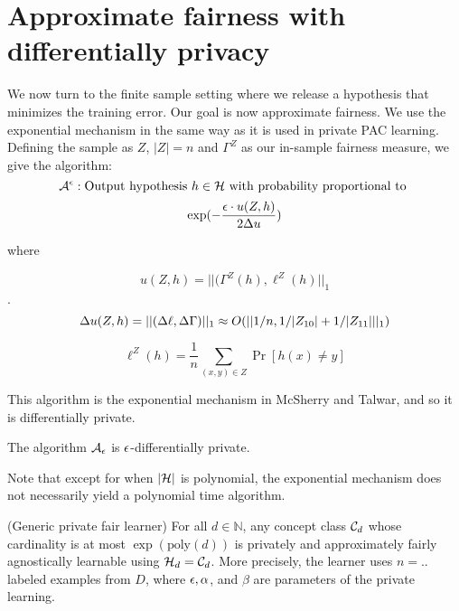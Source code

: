 
\section{Approximate fairness with differentially privacy}



We now turn to the finite sample setting where we release a hypothesis
that minimizes the training error. Our goal is now approximate
fairness. We use the exponential mechanism in the same way as it is
used in private PAC learning. Defining the sample as $Z$, $|Z| = n$ and
$\Gamma^{Z}$ as our in-sample fairness measure, we give the algorithm:
$$\mathcal{A}^\epsilon : \text{Output hypothesis }h \in \mathcal{H} \text{
with probability proportional to }$$
\begin{align}
\exp(-\frac{\epsilon \cdot u(Z,h)}{2\Delta u})
\end{align}

where

$$u(Z,h) = ||(\Gamma^Z(h), \ell^Z(h)||_{1}$$.
$$\Delta u(Z,h) = ||(\Delta\ell,\Delta{\Gamma})||_1 \approx O(||1/n,1/|Z_{10}|+1/|Z_{11}|||_1)$$

$$\ell^Z(h) = \frac{1}{n} \sum_{(x,y) \in Z}\Pr[h(x) \neq y]$$



This algorithm is the exponential mechanism in McSherry and Talwar, and so it is differentially private.

\begin{lemma}
  The algorithm $\mathcal{A}_\epsilon$ is $\epsilon$-differentially private.
\end{lemma}

Note that except for when $|\mathcal{H}|$ is polynomial, the exponential
mechanism does not necessarily yield a polynomial time algorithm.


\begin{theorem}
	(Generic private fair learner) For all $d \in \mathbb{N}$, any
  concept class $\mathcal{C}_d$ whose cardinality is at most
  $\exp(\text{poly}(d))$ is privately and approximately fairly
  agnostically learnable using $\mathcal{H}_d = \mathcal{C}_d$. More precisely, the
  learner uses $n = ..$ labeled examples from $D$, where $\epsilon,
  \alpha$, and $\beta$ are parameters of the private learning.
\end{theorem}

